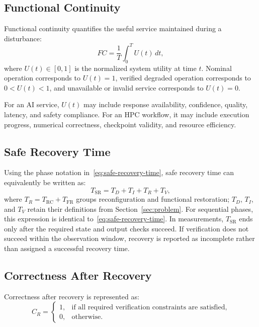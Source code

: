 \documentclass[conference]{IEEEtran}
\begin{document}
\subsection{Functional Continuity}

Functional continuity quantifies the useful service maintained during a disturbance:
\begin{equation}
FC = \frac{1}{T}\int_0^T U(t)\,dt,
\end{equation}
where $U(t) \in [0,1]$ is the normalized system utility at time $t$. Nominal operation corresponds to $U(t)=1$, verified degraded operation corresponds to $0<U(t)<1$, and unavailable or invalid service corresponds to $U(t)=0$.

For an AI service, $U(t)$ may include response availability, confidence, quality, latency, and safety compliance. For an HPC workflow, it may include execution progress, numerical correctness, checkpoint validity, and resource efficiency.

\subsection{Safe Recovery Time}

Using the phase notation in~\eqref{eq:safe-recovery-time}, safe recovery time can equivalently be written as:
\begin{equation}
T_{\mathrm{SR}} = T_D + T_I + T_R + T_V,
\end{equation}
where $T_R = T_{\mathrm{RC}} + T_{\mathrm{FR}}$ groups reconfiguration and functional restoration; $T_D$, $T_I$, and $T_V$ retain their definitions from Section~\ref{sec:problem}. For sequential phases, this expression is identical to~\eqref{eq:safe-recovery-time}. In measurements, $T_{\mathrm{SR}}$ ends only after the required state and output checks succeed. If verification does not succeed within the observation window, recovery is reported as incomplete rather than assigned a successful recovery time.

\subsection{Correctness After Recovery}

Correctness after recovery is represented as:
\begin{equation}
C_R =
\begin{cases}
1, & \text{if all required verification constraints are satisfied}, \\
0, & \text{otherwise}.
\end{cases}
\end{equation}
\end{document}
